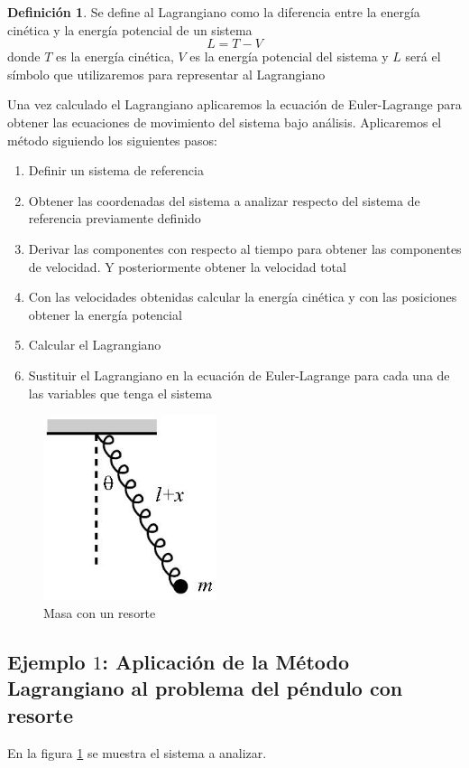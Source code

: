 \documentclass[12pt]{book}
\theoremstyle{definition}
\newtheorem{dfn}{Definición}[section]
\theoremstyle{remark}
\theoremstyle{plain}
\begin{document}
\begin{dfn}
\label{def2}
Se define al Lagrangiano como la diferencia entre la energía cinética y la energía potencial de un sistema
\begin{equation*}
L=T-V
\end{equation*}
donde $T$ es la energía cinética, $V$ es la energía potencial del sistema y $L$ será el símbolo que utilizaremos para representar al Lagrangiano
\end{dfn}

Una vez calculado el Lagrangiano aplicaremos la ecuación de Euler-Lagrange para obtener las ecuaciones de movimiento del sistema bajo análisis. Aplicaremos  el método siguiendo los siguientes pasos:
\begin{enumerate}
\item Definir un sistema de referencia
\item Obtener las coordenadas del sistema a analizar respecto del sistema de referencia previamente definido
\item Derivar las componentes con respecto al tiempo para obtener las componentes de velocidad. Y posteriormente obtener la velocidad total
\item Con las velocidades obtenidas calcular la energía cinética y con las posiciones obtener la energía potencial
\item Calcular el Lagrangiano
\item Sustituir el Lagrangiano en la ecuación de Euler-Lagrange para cada una de las variables que tenga el sistema
\end{enumerate}

\begin{figure}
\centering
\includegraphics[width=2in]{resorte.jpg}
\caption{Masa con un resorte}
\label{fig100}
\end{figure}

\subsection{Ejemplo $1$: Aplicación de la Método Lagrangiano al problema del péndulo con resorte}
 En la figura \ref{fig100} se muestra el sistema a analizar. 
\end{document}
